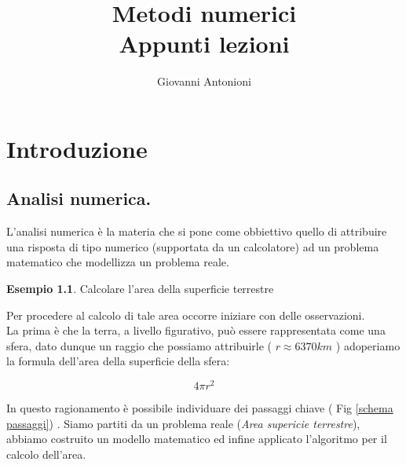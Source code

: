 \documentclass[12pt, a4paper]{book}
\title{
	Metodi numerici \\
	\vspace{1cm}
	Appunti lezioni
}
\date{}
\author{Giovanni Antonioni}
\theoremstyle{definition}
\newtheorem{exmp}{Esempio}[section]
\begin{document}
\maketitle
\tableofcontents
\chapter{Introduzione}

\section{Analisi numerica.}

\begin{flushleft}

L'analisi numerica è la materia che si pone come obbiettivo quello di attribuire una risposta di tipo numerico (supportata da un calcolatore) ad un problema matematico che modellizza un problema reale.

\begin{exmp}
Calcolare l'area della superficie terrestre
\end{exmp}

Per procedere al calcolo di tale area occorre iniziare con delle osservazioni. \\
La prima è che la terra, a livello figurativo, può essere rappresentata come una sfera, dato dunque un raggio che possiamo attribuirle ( $r \approx 6370 km$ ) adoperiamo la formula dell'area della superficie della sfera:

\[ 4\pi r^2 \]

In questo ragionamento è possibile individuare dei passaggi chiave ( Fig \ref{schema passaggi}) .   Siamo partiti da un problema reale (\emph{Area supericie terrestre}), abbiamo costruito un modello matematico ed infine applicato l'algoritmo per il calcolo dell'area. 

\begin{figure}[h]
	\centering
\end{figure}
\end{flushleft}
\end{document}
